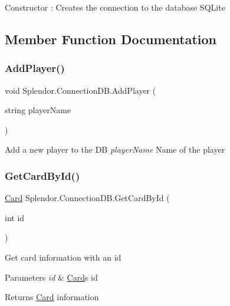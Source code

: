 Constructor \+: Creates the connection to the database S\+Q\+Lite 



\subsection{Member Function Documentation}
\mbox{\label{class_splendor_1_1_connection_d_b_a122fc944f46910732f429432c0f80ec3}} 
\subsubsection{\texorpdfstring{Add\+Player()}{AddPlayer()}}
{\footnotesize\ttfamily void Splendor.\+Connection\+D\+B.\+Add\+Player (\begin{DoxyParamCaption}\item[{string}]{player\+Name }\end{DoxyParamCaption})}



Add a new player to the DB {\itshape player\+Name} Name of the player 

\mbox{\label{class_splendor_1_1_connection_d_b_a1d7511e41b837b176737fd1b8d19f921}} 
\subsubsection{\texorpdfstring{Get\+Card\+By\+Id()}{GetCardById()}}
{\footnotesize\ttfamily \hyperlink{class_splendor_1_1_card}{Card} Splendor.\+Connection\+D\+B.\+Get\+Card\+By\+Id (\begin{DoxyParamCaption}\item[{int}]{id }\end{DoxyParamCaption})}



Get card information with an id 


\begin{DoxyParams}{Parameters}
{\em id} & \hyperlink{class_splendor_1_1_card}{Card}\textquotesingle{}s id\\
\hline
\end{DoxyParams}
\begin{DoxyReturn}{Returns}
\hyperlink{class_splendor_1_1_card}{Card} information
\end{DoxyReturn}
\mbox{\label{class_splendor_1_1_connection_d_b_a020bd54ace4a6b36ccc8c1661d5322e7}} 
